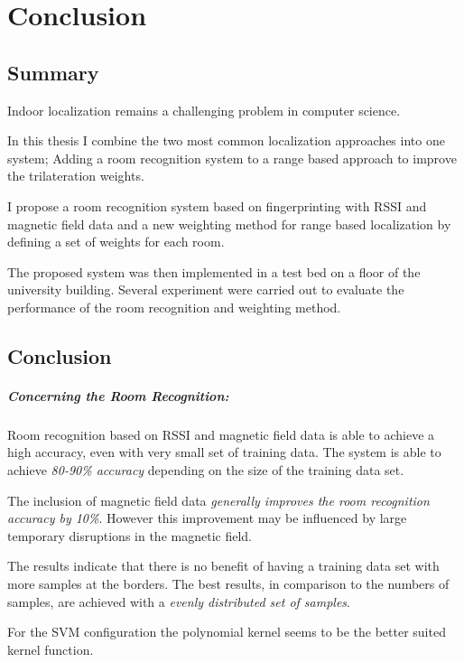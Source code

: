\chapter{Conclusion}

\label{Chapter6}

\section{Summary}


Indoor localization remains a challenging problem in computer science.

In this thesis I combine the two most common localization approaches into one system; Adding a room recognition system to a range based approach to improve the trilateration weights.

I propose a room recognition system based on fingerprinting with RSSI and magnetic field data and a new weighting method for range based localization by defining a set of weights for each room.

The proposed system was then implemented in a test bed on a floor of the university building. Several experiment were carried out to evaluate the performance of the room recognition and weighting method.

\section{Conclusion}

\paragraph{Concerning the Room Recognition:}
Room recognition based on RSSI and magnetic field data is able to achieve a high accuracy, even with very small set of training data. The system is able to achieve \emph{80-90\% accuracy} depending on the size of the training data set.

The inclusion of magnetic field data \emph{generally improves the room recognition accuracy by 10\%}. However this improvement may be influenced by large temporary disruptions in the magnetic field.

The results indicate that there is no benefit of having a training data set with more samples at the borders. The best results, in comparison to the numbers of samples, are achieved with a \emph{evenly distributed set of samples}. 
 
For the SVM configuration the polynomial kernel seems to be the better suited kernel function.



